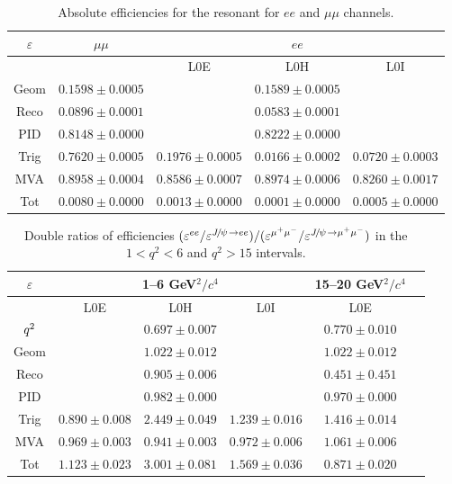 \begin{table}[h!]
\centering
\caption{Absolute efficiencies for the resonant for $ee$ and $\mu\mu$ channels.}
\begin{tabular}{|c|c|c|c|c|}
\hline $\varepsilon$ 			&  $\mu\mu$ 	& \multicolumn {3}{c|}{$ee$} \\ \hline
			&   &  L0E 	& L0H 	& L0I \\ \hline
	Geom  & $ 0.1598  \pm  0.0005 $ & \multicolumn{3}{c|}{$ 0.1589  \pm  0.0005 $} \\
	Reco  & $ 0.0896  \pm  0.0001 $ & \multicolumn{3}{c|}{$ 0.0583  \pm  0.0001 $} \\
	PID  & $ 0.8148  \pm  0.0000 $ & \multicolumn{3}{c|}{$ 0.8222  \pm  0.0000 $} \\
	\hline
	Trig  & $ 0.7620  \pm  0.0005 $ & $ 0.1976  \pm  0.0005 $ & $ 0.0166  \pm  0.0002 $ & $ 0.0720  \pm  0.0003 $ \\
	MVA  & $ 0.8958  \pm  0.0004 $ & $ 0.8586  \pm  0.0007 $ & $ 0.8974  \pm  0.0006 $ & $ 0.8260  \pm  0.0017 $ \\
	\hline
	Tot  & $ 0.0080  \pm  0.0000 $ & $ 0.0013  \pm  0.0000 $ & $ 0.0001  \pm  0.0000 $ & $ 0.0005  \pm  0.0000 $ \\
	\hline
	\end{tabular}
\label{tab:AbsEff_jpsi}
\end{table}

\begin{table}[h!]
\centering
\caption{Double ratios of efficiencies 
$(\varepsilon^{ee} / \varepsilon^{\jpsi\to ee}) / (\varepsilon^{\mumu} / \varepsilon^{\jpsi\to\mumu})$
in the $1 < q^2 < 6$ and $q^2 > 15$ \gevgevcccc intervals.}
\begin{tabular}{|c|c|c|c|c|c|}
\hline
$\varepsilon$ &  \multicolumn{3}{c|}{ 1--6 GeV$^2/c^4$} &  \multicolumn{1}{c|}{ 15--20 GeV$^2/c^4$ } \\
\hline  &  L0E 	& L0H 	& L0I &  L0E 	\\ \hline
${q^2}$  & \multicolumn{3}{c|}{$ 0.697 \pm 0.007 $} &  \multicolumn{1}{c|}{$ 0.770 \pm 0.010 $} \\
Geom  & \multicolumn{3}{c|}{$ 1.022 \pm 0.012 $} &  \multicolumn{1}{c|}{$ 1.022 \pm 0.012 $} \\
Reco  & \multicolumn{3}{c|}{$ 0.905 \pm 0.006 $} &  \multicolumn{1}{c|}{$ 0.451 \pm 0.451 $} \\
PID  & \multicolumn{3}{c|}{$ 0.982 \pm 0.000 $} &  \multicolumn{1}{c|}{$ 0.970 \pm 0.000 $} \\
\hline
Trig  & $ 0.890 \pm 0.008 $ & $ 2.449 \pm 0.049 $ & $ 1.239 \pm 0.016 $ & $ 1.416 \pm 0.014 $  \\ 
MVA  & $ 0.969 \pm 0.003 $ & $ 0.941 \pm 0.003 $ & $ 0.972 \pm 0.006 $ & $ 1.061 \pm 0.006 $  \\  
\hline
Tot  & $ 1.123 \pm 0.023 $ & $ 3.001 \pm 0.081 $ & $ 1.569 \pm 0.036 $ & $ 0.871 \pm 0.020 $  \\  
\hline
\end{tabular}
\label{tab:double_rel_eff}
\end{table}

